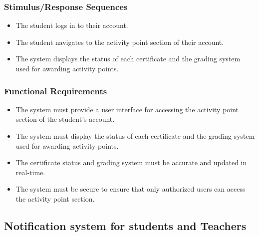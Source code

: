 \documentclass{article}
\begin{document}
\subsubsection{Stimulus/Response Sequences}
\begin{itemize}
  \item The student logs in to their account.
  \item The student navigates to the activity point section of their account.
  \item The system displays the status of each certificate and the grading system used for awarding activity points.
\end{itemize}

\subsubsection{Functional Requirements}
\begin{itemize}
\item The system must provide a user interface for accessing the activity point section of the student's account.
\item The system must display the status of each certificate and the grading system used for awarding activity points.
\item The certificate status and grading system must be accurate and updated in real-time.
\item The system must be secure to ensure that only authorized users can access the activity point section.
\end{itemize}





\subsection{Notification system for students and Teachers}
\end{document}
